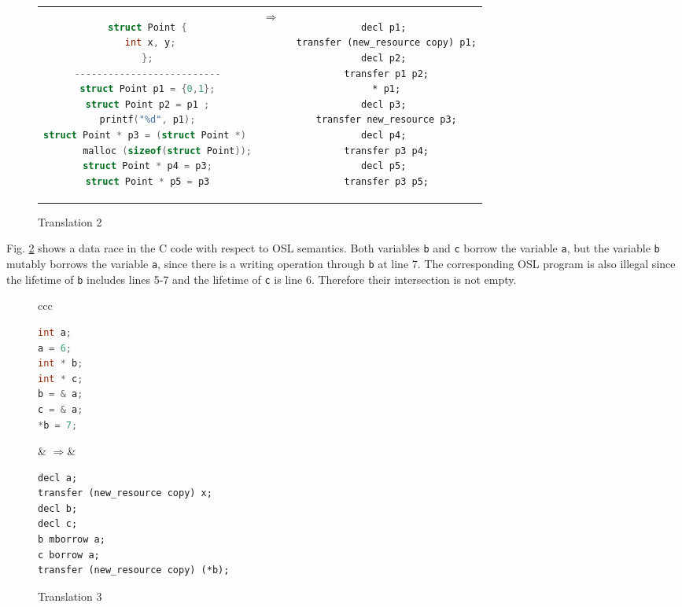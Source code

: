 \documentclass[runningheads]{llncs}
\def\codec#1{\texttt{#1}}
\begin{document}
\begin{figure}
	\vspace{-0.5cm}
\begin{tabular}{ccc}
	\begin{minipage}{0.45\textwidth}
		\renewcommand{\ttdefault}{pcr}
		\begin{lstlisting}[language=C]
struct Point {
 int x, y;
};
--------------------------
struct Point p1 = {0,1};
struct Point p2 = p1 ;
printf("%d", p1);
struct Point * p3 = (struct Point *) 
       malloc (sizeof(struct Point));
struct Point * p4 = p3;
struct Point * p5 = p3
		\end{lstlisting}
	\end{minipage}
	& \quad$\Rightarrow$\quad \quad~& 
	\begin{minipage}{0.38\textwidth}
		\renewcommand{\ttdefault}{pcr}{\scriptsize
			\begin{lstlisting}
decl p1; 
transfer (new_resource copy) p1;
decl p2; 
transfer p1 p2;
* p1;
decl p3; 
transfer new_resource p3;
decl p4; 
transfer p3 p4;
decl p5; 
transfer p3 p5;
			\end{lstlisting}}
	\end{minipage} 
\end{tabular}
\caption{Translation 2}
\label{fig:translation2}
\vspace{-0.5cm}
\end{figure}
Fig. \ref{fig:translation3} shows a data race in the C code with respect to OSL semantics.
Both variables \codec{b} and \codec{c} borrow the variable \codec{a}, but
the variable \codec{b} mutably borrows the variable \codec{a}, since there is
a writing operation through \codec{b} at line 7.
The corresponding OSL program is also illegal since the lifetime
of \codec{b} includes lines 5-7 and the lifetime of \codec{c} is line 6.
Therefore their intersection is not empty.

\begin{figure}
	\vspace{-0.2cm}
\begin{center}
	\begin{tabular}{ccc}
		\begin{minipage}{0.25\textwidth}
			\renewcommand{\ttdefault}{pcr}
			\begin{lstlisting}[language=C]
int a;
a = 6;
int * b;
int * c;
b = & a;
c = & a;
*b = 7;
	\end{lstlisting}
		\end{minipage}
		& \quad$\Rightarrow$\quad \quad\quad& 
		\begin{minipage}{0.43\textwidth}
			\renewcommand{\ttdefault}{pcr}{\scriptsize
				\begin{lstlisting}
decl a;
transfer (new_resource copy) x;
decl b; 
decl c;
b mborrow a;
c borrow a;
transfer (new_resource copy) (*b);
				\end{lstlisting}}
		\end{minipage} 
	\end{tabular}
\end{center}
\vspace{-0.5cm}
\caption{Translation 3}
\label{fig:translation3}
\vspace{-0.5cm}
\end{figure}
\end{document}
